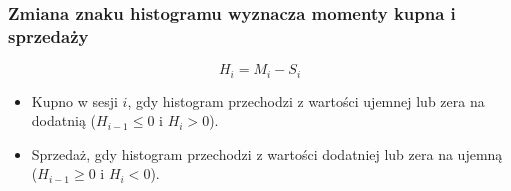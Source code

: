 \begin{frame}
  \frametitle{Zmiana znaku histogramu wyznacza momenty kupna i sprzedaży}
  \begin{equation*}
    H_i = M_i - S_i
    \tag{4}
  \end{equation*}
  \vskip2mm
  \begin{itemize}
    \item Kupno w sesji $i$, gdy histogram przechodzi z wartości ujemnej
      lub zera na dodatnią ($H_{i-1} \le 0$ i $H_i > 0$).
    \item Sprzedaż, gdy histogram przechodzi z wartości dodatniej lub zera
      na ujemną ($H_{i-1} \ge 0$ i $H_i < 0$).
  \end{itemize}
\end{frame}
